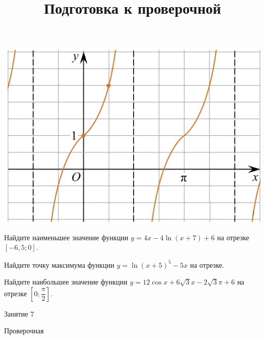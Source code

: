 \begin{homework}[number=3]
\begin{listofex}
\begin{minipage}[t]{\picwidth}
			\includegraphics[align=t, width=\linewidth]{../pics/MECGERM6H3-2.jpg}
		\end{minipage}
		\item Найдите наименьшее значение функции \( y=4x-4 \ln(x+7)+6 \) на отрезке \( [-6,5;0] \). %
		\item Найдите точку максимума функции \( y=\ln(x+5)^5-5x \) на отрезке. %
		\item Найдите наибольшее значение функции \( y=12\cos x + 6\sqrt{3} x - 2 \sqrt{3} \pi + 6 \) на отрезке \( \left[ 0; \dfrac{ \pi }{ 2 } \right]  \).
	\end{listofex}
\end{homework}

\begin{class}[number=7]
	\title{Подготовка к проверочной}
	\begin{listofex}
		\item Занятие 7
	\end{listofex}
\end{class}

\begin{exam}
	\begin{listofex}
		\item Проверочная
	\end{listofex}
\end{exam}

